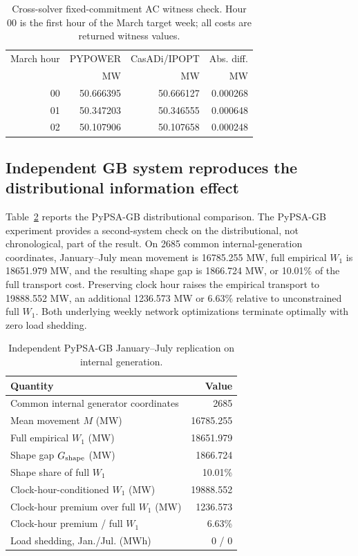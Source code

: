 \documentclass[journal]{IEEEtran}
\begin{document}
\begin{table}[t]
\caption{Cross-solver fixed-commitment AC witness check. Hour 00 is the first hour of the March target week; all costs are returned witness values.}
\label{tab:crosssolver}
\centering
\footnotesize
\begin{tabular}{rrrr}
\toprule
March hour & PYPOWER & CasADi/IPOPT & Abs. diff.\\
 & MW & MW & MW\\
\midrule
00 & 50.666395 & 50.666127 & 0.000268\\
01 & 50.347203 & 50.346555 & 0.000648\\
02 & 50.107906 & 50.107658 & 0.000248\\
\bottomrule
\end{tabular}
\end{table}

\subsection{Independent GB system reproduces the distributional information effect}
Table~\ref{tab:gb} reports the PyPSA-GB distributional comparison.
The PyPSA-GB experiment provides a second-system check on the distributional, not chronological, part of the result. On 2685 common internal-generation coordinates, January--July mean movement is 16785.255 MW, full empirical $W_1$ is 18651.979 MW, and the resulting shape gap is 1866.724 MW, or 10.01\% of the full transport cost. Preserving clock hour raises the empirical transport to 19888.552 MW, an additional 1236.573 MW or 6.63\% relative to unconstrained full $W_1$. Both underlying weekly network optimizations terminate optimally with zero load shedding.

\begin{table}[t]
\caption{Independent PyPSA-GB January--July replication on internal generation.}
\label{tab:gb}
\centering
\footnotesize
\begin{tabular}{lr}
\toprule
Quantity & Value\\
\midrule
Common internal generator coordinates & 2685\\
Mean movement $M$ (MW) & 16785.255\\
Full empirical $W_1$ (MW) & 18651.979\\
Shape gap $G_{\rm shape}$ (MW) & 1866.724\\
Shape share of full $W_1$ & 10.01\%\\
Clock-hour-conditioned $W_1$ (MW) & 19888.552\\
Clock-hour premium over full $W_1$ (MW) & 1236.573\\
Clock-hour premium / full $W_1$ & 6.63\%\\
Load shedding, Jan./Jul. (MWh) & 0 / 0\\
\bottomrule
\end{tabular}
\end{table}
\end{document}
